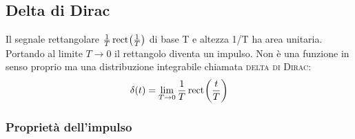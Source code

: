 \subsection{Delta di Dirac}
Il segnale rettangolare $\frac{1}{T} \,{\operatorname{rect}}^{}\!\left({\frac{1}{T}}\right)$ di base T e altezza 1/T ha area unitaria. Portando al limite $T\to 0$ il rettangolo diventa un impulso. Non è una funzione in senso proprio ma una distribuzione integrabile chiamata \textsc{delta di Dirac}:
\begin{equation}
\delta(t)=\lim\limits_{T\to 0}\frac{1}{T}\,{\operatorname{rect}}^{}\!\left({\frac{t}{T}}\right)
\end{equation}

\subsubsection{Proprietà dell'impulso}
